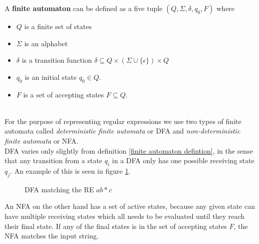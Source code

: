 \documentclass[12pt]{article}
\theoremstyle{definition}
\begin{document}
\begin{definition} A \textbf{finite automaton} can be defined as a five tuple $(Q, \Sigma, \delta, q_0, F)$ where
\label{finite automaton defintion}

\begin{itemize}
	\item $Q$ is a finite set of states
	\item $\Sigma$ is an alphabet
	\item $\delta$ is a transition function $\delta \subseteq Q \times (\Sigma \cup \{\epsilon\}) \times Q$
	\item $q_0$ is an initial state $q_0 \in Q$.
	\item $F$ is a set of accepting states $F \subseteq Q$.
\end{itemize}

\end{definition}

\ \\

For the purpose of representing regular expressions we use two types of finite automata called \textit{deterministic finite automata} or DFA and \textit{non-deterministic finite automata} or NFA. \\
DFA varies only slightly from definition \ref{finite automaton defintion}, in the sense that any transition from a state $q_i$ in a DFA only has one possible receiving state $q_j$. An example of this is seen in figure \ref{dfa_simple}. \\

\begin{figure}[H]
  \begin{center}

	
	\caption{DFA matching the RE \underline{$ab*c$}}
	\label{dfa_simple}
  \end{center}
\end{figure}

An NFA on the other hand has a set of active states, because any given state can have multiple receiving states which all needs to be evaluated until they reach their final state. If any of the final states is in the set of accepting states $F$, the NFA matches the input string.
\end{document}
